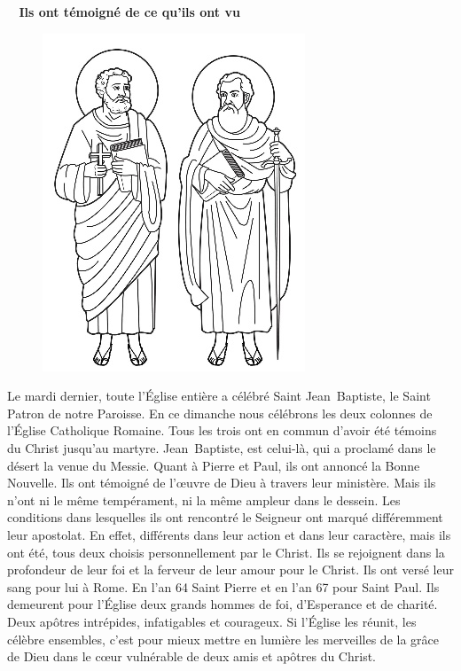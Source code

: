 
 \begin{center}
 \textbf{
\og 
Ils ont témoigné de ce qu’ils ont vu
 \fg{}
 }
 \end{center}

\begin{figure}
\vspace{-0.5cm}
	\includegraphics[scale=0.7]{../images/pierre_paul}
\end{figure}
Le mardi dernier, toute l’Église entière a célébré Saint Jean~Baptiste, le Saint Patron de notre Paroisse.
En ce dimanche nous célébrons les deux colonnes de l’Église Catholique Romaine. Tous les trois ont en commun d’avoir été témoins du Christ jusqu’au martyre. Jean~Baptiste, est celui-là, qui a proclamé dans le désert la venue du Messie. Quant à Pierre et Paul, ils ont annoncé la Bonne Nouvelle. Ils ont témoigné de l’œuvre de Dieu à travers leur ministère. Mais ils n’ont ni le même tempérament, ni la même ampleur dans le dessein. Les conditions dans lesquelles ils ont rencontré le Seigneur ont marqué différemment leur apostolat. En effet, différents dans leur action et dans leur caractère, mais ils ont été, tous deux choisis personnellement par le Christ. Ils se rejoignent dans la profondeur de leur foi et la ferveur de leur amour pour le Christ. Ils ont versé leur sang pour lui à Rome. En l’an 64 Saint Pierre et en l’an 67 pour Saint Paul. Ils demeurent pour l’Église deux grands hommes de foi, d’Esperance et de charité. Deux apôtres intrépides, infatigables et courageux. Si l’Église les réunit, les célèbre ensembles, c’est pour mieux mettre en lumière les merveilles de la grâce de Dieu dans le cœur vulnérable de deux amis et apôtres du Christ.

